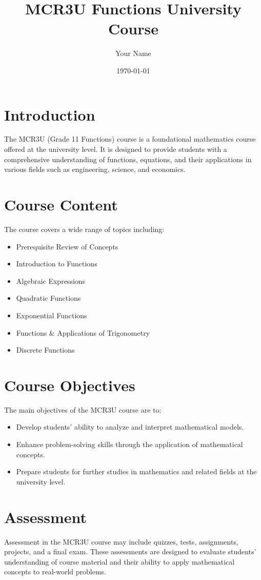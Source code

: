 \documentclass{article}
\title{MCR3U Functions University Course}
\author{Your Name}
\date{\today}
\begin{document}
\maketitle

\section{Introduction}
The MCR3U (Grade 11 Functions) course is a foundational mathematics course offered at the university level. It is designed to provide students with a comprehensive understanding of functions, equations, and their applications in various fields such as engineering, science, and economics.

\section{Course Content}
The course covers a wide range of topics including:
\begin{itemize}
    \item Prerequisite Review of Concepts
    \item Introduction to Functions
    \item Algebraic Expressions
    \item Quadratic Functions
    \item Exponential Functions
    \item Functions \& Applications of Trigonometry
    \item Discrete Functions
\end{itemize}

\section{Course Objectives}
The main objectives of the MCR3U course are to:
\begin{itemize}
    \item Develop students' ability to analyze and interpret mathematical models.
    \item Enhance problem-solving skills through the application of mathematical concepts.
    \item Prepare students for further studies in mathematics and related fields at the university level.
\end{itemize}

\section{Assessment}
Assessment in the MCR3U course may include quizzes, tests, assignments, projects, and a final exam. These assessments are designed to evaluate students' understanding of course material and their ability to apply mathematical concepts to real-world problems.
\end{document}

